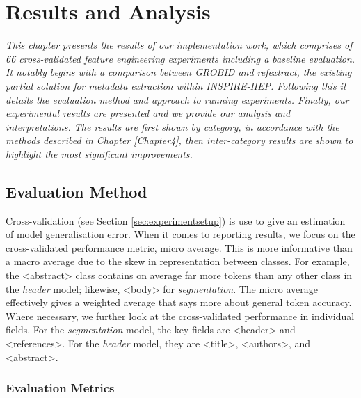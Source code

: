 
\chapter{Results and Analysis} %

\label{Chapter5} %


\emph{This chapter presents the results of our implementation work, which comprises of 66 cross-validated feature engineering experiments including a baseline evaluation. It notably begins with a comparison between GROBID and refextract, the existing partial solution for metadata extraction within INSPIRE-HEP. Following this it details the evaluation method and approach to running experiments. Finally, our experimental results are presented and we provide our analysis and interpretations. The results are first shown by category, in accordance with the methods described in Chapter \ref{Chapter4}, then inter-category results are shown to highlight the most significant improvements.}

\section{Evaluation Method}

Cross-validation (see Section \ref{sec:experimentsetup}) is use to give an estimation of model generalisation error. When it comes to reporting results, we focus on the cross-validated performance metric, micro average. This is more informative than a macro average due to the skew in representation between classes. For example, the <abstract> class contains on average far more tokens than any other class in the \emph{header} model; likewise, <body> for \emph{segmentation}. The micro average effectively gives a weighted average that says more about general token accuracy. Where necessary, we further look at the cross-validated performance in individual fields. For the \emph{segmentation} model, the key fields are <header> and <references>. For the \emph{header} model, they are <title>, <authors>, and <abstract>.

\subsection{Evaluation Metrics}
\label{subsec:evaluationmethod}

